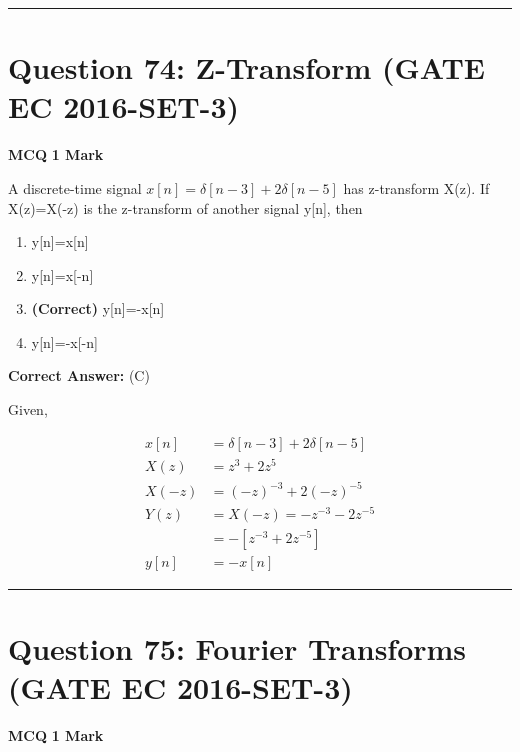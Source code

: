 \documentclass[11pt,a4paper]{article}
\begin{document}
\vspace{1.5em}
\hrule
\vspace{1.5em}

\section*{Question 74: Z-Transform (GATE EC 2016-SET-3)}
\noindent \textbf{\color{primary}MCQ} \hfill \textbf{\color{secondary}1 Mark}


\noindent A discrete-time signal $x[n]=\delta [n-3]+2\delta [n-5]$ has z-transform X(z). If X(z)=X(-z) is the z-transform of another signal y[n], then


\begin{enumerate}[label=(\Alph*)]
    \item y[n]=x[n]
    \item y[n]=x[-n]
    \item \textbf{(Correct)} y[n]=-x[n]
    \item y[n]=-x[-n]
\end{enumerate}

\noindent \textbf{Correct Answer:} (C)

\begin{tcolorbox}[solbox, title=Detailed Solution -- Question 74]
Given,

\[
\begin{aligned} x[n] &=\delta[n-3]+2 \delta[n-5] \\ X(z) &=z^{3}+2 z^{5} \\ X(-z) &=(-z)^{-3}+2(-z)^{-5} \\ Y(z) &=X(-z)=-z^{-3}-2 z^{-5} \\ &=-\left[z^{-3}+2 z^{-5}\right] \\ y[n] &=-x[n] \end{aligned}
\]
\end{tcolorbox}

\vspace{1.5em}
\hrule
\vspace{1.5em}

\section*{Question 75: Fourier Transforms (GATE EC 2016-SET-3)}
\noindent \textbf{\color{primary}MCQ} \hfill \textbf{\color{secondary}1 Mark}
\end{document}

